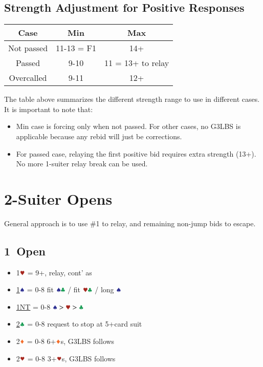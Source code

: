 \documentclass{article}
\begin{document}
\begin{multicols}{2}
\subsection{Strength Adjustment for Positive Responses}
\begin{tabular}{c|c|c}
    \hline
    Case & Min & Max \\ \hline
    Not passed & 11-13 = F1 & 14+ \\ \hline
    Passed & 9-10 & 11 = 13+ to relay \\ \hline
    Overcalled & 9-11 & 12+ \\ \hline
\end{tabular}

\noindent The table above summarizes the different strength range to use in different cases. It is important to note that:
\begin{itemize}
    \item Min case is forcing only when not passed. For other cases, no G3LBS is applicable because any rebid will just be corrections.
    \item For passed case, relaying the first positive bid requires extra strength (13+). No more 1-suiter relay break can be used.
\end{itemize}

\section{2-Suiter Opens}
General approach is to use \#1 to relay, and remaining non-jump bids to escape.

\subsection{1\DDD\ Open}\label{sec:1d}
\begin{itemize}
    \item 1$\hhh$ = 9+, relay, cont' as 
    \item \hyperref[sec:1d-escape]{1$\sss$} = 0-8 fit $\sss\ccc$ / fit $\hhh\ccc$ / long $\sss$
    \item \hyperref[sec:1d-escape]{1NT} = 0-8 $\sss>\hhh>\ccc$
    \item \hyperref[sec:1d-escape]{2$\ccc$} = 0-8 request to stop at 5+card suit
    \item 2$\ddd$ = 0-8 6+$\ddd$s, G3LBS follows
    \item 2$\hhh$ = 0-8 3+$\hhh$s, G3LBS follows
\end{itemize}


\end{multicols}
\end{document}
